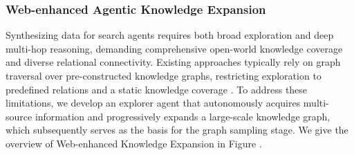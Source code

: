 \documentclass{huawei}
\begin{document}



\subsubsection{Web-enhanced Agentic Knowledge Expansion}

Synthesizing data for search agents requires both broad exploration and deep multi-hop reasoning, demanding comprehensive open-world knowledge coverage and diverse relational connectivity. Existing approaches typically rely on graph traversal over pre-constructed knowledge graphs, restricting exploration to predefined relations and a static knowledge coverage \cite{qwenbai2023qwen,chu2026redsearcher}.
To address these limitations, we develop an explorer agent that autonomously acquires multi-source information and progressively expands a large-scale knowledge graph, which subsequently serves as the basis for the graph sampling stage. 
We give the overview of Web-enhanced Knowledge Expansion in Figure .
\end{document}
